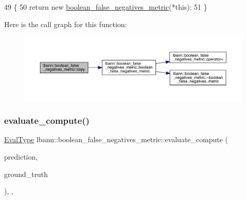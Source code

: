 \begin{DoxyCode}
49                                                         \{
50     \textcolor{keywordflow}{return} \textcolor{keyword}{new} \hyperlink{classlbann_1_1boolean__false__negatives__metric_abb7220421c393713e5a79a3da3b4b79c}{boolean\_false\_negatives\_metric}(*\textcolor{keyword}{this});
51   \}
\end{DoxyCode}
Here is the call graph for this function\+:\nopagebreak
\begin{figure}[H]
\begin{center}
\leavevmode
\includegraphics[width=350pt]{classlbann_1_1boolean__false__negatives__metric_abd0e7a6040232d5b6d8b10e79a3208c1_cgraph}
\end{center}
\end{figure}
\mbox{\label{classlbann_1_1boolean__false__negatives__metric_a598dfc1ee40c4e11f001cbf8899e0e0a}} 
\subsubsection{\texorpdfstring{evaluate\+\_\+compute()}{evaluate\_compute()}}
{\footnotesize\ttfamily \hyperlink{base_8hpp_a3266f5ac18504bbadea983c109566867}{Eval\+Type} lbann\+::boolean\+\_\+false\+\_\+negatives\+\_\+metric\+::evaluate\+\_\+compute (\begin{DoxyParamCaption}\item[{const \hyperlink{base_8hpp_a9a697a504ae84010e7439ffec862b470}{Abs\+Dist\+Mat} \&}]{prediction,  }\item[{const \hyperlink{base_8hpp_a9a697a504ae84010e7439ffec862b470}{Abs\+Dist\+Mat} \&}]{ground\+\_\+truth }\end{DoxyParamCaption})\hspace{0.3cm}{\ttfamily [override]}, {\ttfamily [protected]}, {\ttfamily [virtual]}}

